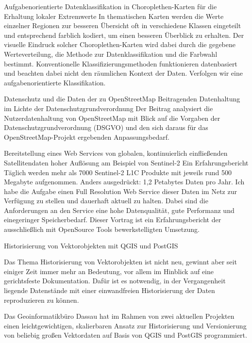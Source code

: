 %
{Aufgabenorientierte Datenklassifikation in Choroplethen-Karten für die Erhaltung lokaler Extremwerte}%
{}%
{%
In thematischen Karten werden die Werte einzelner Regionen zur besseren Übersicht oft in verschiedene Klassen eingeteilt und entsprechend farblich kodiert, um einen besseren Überblick zu erhalten. Der visuelle Eindruck solcher Choroplethen-Karten wird dabei durch die gegebene Werteverteilung, die Methode zur Datenklassifikation und die Farbwahl bestimmt. Konventionelle Klassifizierungsmethoden funktionieren datenbasiert und beachten dabei nicht den räumlichen Kontext der Daten. Verfolgen wir eine aufgabenorientierte Klassifikation.%
}



%
{Datenschutz und die Daten der zu OpenStreetMap Beitragenden}%
{Datenhaltung im Lichte der Datenschutzgrundverordnung}%
{%
Der Beitrag analysiert die Nutzerdatenhaltung von OpenStreetMap mit Blick auf die Vorgaben der Datenschutzgrundverordnung (DSGVO) und den sich daraus für das OpenStreetMap-Projekt ergebenden Anpassungsbedarf.%
}

%
{Bereitstellung eines Web Services von globalen, kontinuierlich einfließenden Satellitendaten hoher Auflösung am Beispiel von Sentinel-2}%
{Ein Erfahrungsbericht}%
{%
Täglich werden mehr als 7000 Sentinel-2 L1C Produkte mit jeweils rund 500 Megabyte aufgenommen. Anders ausgedrückt: 1,2 Petabytes Daten pro Jahr. Ich habe die Aufgabe einen Full Resolution Web Service dieser Daten im Netz zur Verfügung zu stellen und dauerhaft aktuell zu halten. Dabei sind die Anforderungen an den Service eine hohe Datenqualität, gute Performanz und einegeringer Speicherbedarf. Dieser Vortrag ist ein Erfahrungsbericht der ausschließlich mit OpenSource Tools bewerkstelligten Umsetzung.%
}



%
{Historisierung von Vektorobjekten mit QGIS und PostGIS}%
{}%
{%
Das Thema Historisierung von Vektorobjekten ist nicht neu, gewinnt aber seit einiger Zeit immer mehr an Bedeutung, vor allem im Hinblick auf eine gerichtsfeste Dokumentation. Dafür ist es notwendig, in der Vergangenheit liegende Datenstände mit einer einwandfreien Historisierung der Daten reproduzieren zu können.

Das Geoinformatikbüro Dassau hat im Rahmen von zwei aktuellen Projekten einen leichtgewichtigen, skalierbaren Ansatz zur Historisierung und Versionierung von beliebig großen Vektordaten auf Basis von QGIS und PostGIS programmiert.%
}

